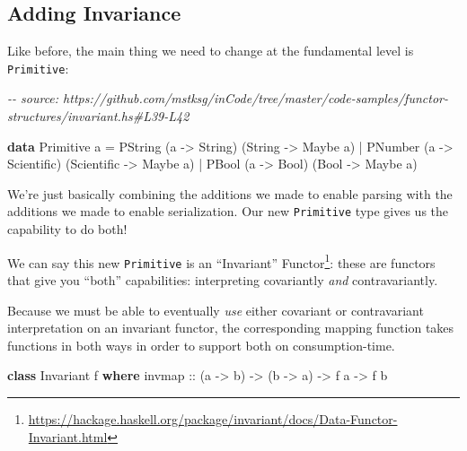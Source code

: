 \documentclass[]{article}
\newenvironment{Shaded}{}{}
\newcommand{\CommentTok}[1]{\textcolor[rgb]{0.38,0.63,0.69}{\textit{#1}}}
\newcommand{\DataTypeTok}[1]{\textcolor[rgb]{0.56,0.13,0.00}{#1}}
\newcommand{\KeywordTok}[1]{\textcolor[rgb]{0.00,0.44,0.13}{\textbf{#1}}}
\newcommand{\NormalTok}[1]{#1}
\newcommand{\OperatorTok}[1]{\textcolor[rgb]{0.40,0.40,0.40}{#1}}
\newcommand{\OtherTok}[1]{\textcolor[rgb]{0.00,0.44,0.13}{#1}}
\renewcommand{\href}[2]{#2\footnote{\url{#1}}}
\begin{document}
\hypertarget{adding-invariance}{%
\subsection{Adding Invariance}\label{adding-invariance}}

Like before, the main thing we need to change at the fundamental level is
\texttt{Primitive}:

\begin{Shaded}
\begin{Highlighting}[]
\CommentTok{{-}{-} source: https://github.com/mstksg/inCode/tree/master/code{-}samples/functor{-}structures/invariant.hs\#L39{-}L42}

\KeywordTok{data} \DataTypeTok{Primitive}\NormalTok{ a }\OtherTok{=}
      \DataTypeTok{PString}\NormalTok{ (a }\OtherTok{{-}>} \DataTypeTok{String}\NormalTok{)     (}\DataTypeTok{String}     \OtherTok{{-}>} \DataTypeTok{Maybe}\NormalTok{ a)}
    \OperatorTok{|} \DataTypeTok{PNumber}\NormalTok{ (a }\OtherTok{{-}>} \DataTypeTok{Scientific}\NormalTok{) (}\DataTypeTok{Scientific} \OtherTok{{-}>} \DataTypeTok{Maybe}\NormalTok{ a)}
    \OperatorTok{|} \DataTypeTok{PBool}\NormalTok{   (a }\OtherTok{{-}>} \DataTypeTok{Bool}\NormalTok{)       (}\DataTypeTok{Bool}       \OtherTok{{-}>} \DataTypeTok{Maybe}\NormalTok{ a)}
\end{Highlighting}
\end{Shaded}

We're just basically combining the additions we made to enable parsing with the
additions we made to enable serialization. Our new \texttt{Primitive} type gives
us the capability to do both!

We can say this new \texttt{Primitive} is an
\href{https://hackage.haskell.org/package/invariant/docs/Data-Functor-Invariant.html}{``Invariant''
Functor}: these are functors that give you ``both'' capabilities: interpreting
covariantly \emph{and} contravariantly.

Because we must be able to eventually \emph{use} either covariant or
contravariant interpretation on an invariant functor, the corresponding mapping
function takes functions in both ways in order to support both on
consumption-time.

\begin{Shaded}
\begin{Highlighting}[]
\KeywordTok{class} \DataTypeTok{Invariant}\NormalTok{ f }\KeywordTok{where}
\OtherTok{    invmap ::}\NormalTok{ (a }\OtherTok{{-}>}\NormalTok{ b) }\OtherTok{{-}>}\NormalTok{ (b }\OtherTok{{-}>}\NormalTok{ a) }\OtherTok{{-}>}\NormalTok{ f a }\OtherTok{{-}>}\NormalTok{ f b}
\end{Highlighting}
\end{Shaded}
\end{document}
